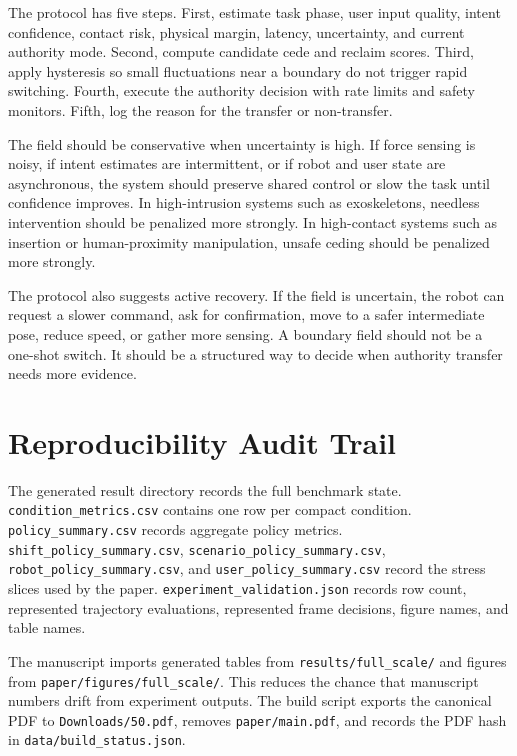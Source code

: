 \documentclass{article}
\begin{document}
The protocol has five steps. First, estimate task phase, user input quality, intent confidence, contact risk, physical margin, latency, uncertainty, and current authority mode. Second, compute candidate cede and reclaim scores. Third, apply hysteresis so small fluctuations near a boundary do not trigger rapid switching. Fourth, execute the authority decision with rate limits and safety monitors. Fifth, log the reason for the transfer or non-transfer.

The field should be conservative when uncertainty is high. If force sensing is noisy, if intent estimates are intermittent, or if robot and user state are asynchronous, the system should preserve shared control or slow the task until confidence improves. In high-intrusion systems such as exoskeletons, needless intervention should be penalized more strongly. In high-contact systems such as insertion or human-proximity manipulation, unsafe ceding should be penalized more strongly.

The protocol also suggests active recovery. If the field is uncertain, the robot can request a slower command, ask for confirmation, move to a safer intermediate pose, reduce speed, or gather more sensing. A boundary field should not be a one-shot switch. It should be a structured way to decide when authority transfer needs more evidence.

\clearpage
\section{Reproducibility Audit Trail}

The generated result directory records the full benchmark state. \texttt{condition\_metrics.csv} contains one row per compact condition. \texttt{policy\_summary.csv} records aggregate policy metrics. \texttt{shift\_policy\_summary.csv}, \texttt{scenario\_policy\_summary.csv}, \texttt{robot\_policy\_summary.csv}, and \texttt{user\_policy\_summary.csv} record the stress slices used by the paper. \texttt{experiment\_validation.json} records row count, represented trajectory evaluations, represented frame decisions, figure names, and table names.

The manuscript imports generated tables from \texttt{results/full\_scale/} and figures from \texttt{paper/figures/full\_scale/}. This reduces the chance that manuscript numbers drift from experiment outputs. The build script exports the canonical PDF to \texttt{Downloads/50.pdf}, removes \texttt{paper/main.pdf}, and records the PDF hash in \texttt{data/build\_status.json}.
\end{document}
